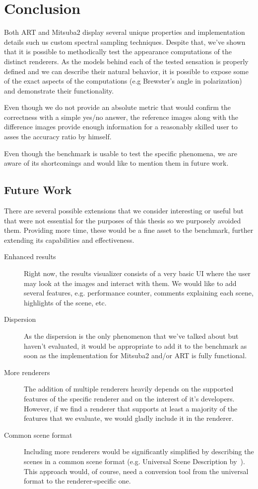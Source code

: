 \chapter*{Conclusion}

Both ART and Mitsuba2 display several unique properties and implementation details such us custom spectral sampling techniques. Despite that, we've shown that it is possible to methodically test the appearance computations of the distinct renderers. As the models behind each of the tested sensation is properly defined and we can describe their natural behavior, it is possible to expose some of the exact aspects of the computations (e.g Brewster's angle in polarization) and demonstrate their functionality.

Even though we do not provide an absolute metric that would confirm the correctness with a simple yes/no answer, the reference images along with the difference images provide enough information for a reasonably skilled user to asses the accuracy ratio by himself.

Even though the benchmark is usable to test the specific phenomena, we are aware of its shortcomings and would like to mention them in future work. 

\section{Future Work}

There are several possible extensions that we consider interesting or useful but that were not essential for the purposes of this thesis so we purposely avoided them. Providing more time, these would be a fine asset to the benchmark, further extending its capabilities and effectiveness.

\begin{description}
	\item[Enhanced results] Right now, the results visualizer consists of a very basic UI where the user may look at the images and interact with them. We would like to add several features, e.g. performance counter, comments explaining each scene, highlights of the scene, etc.
	\item[Dispersion] As the dispersion is the only phenomenon that we've talked about but haven't evaluated, it would be appropriate to add it to the benchmark as soon as the implementation for Mitsuba2 and/or ART is fully functional.
	\item[More renderers] The addition of multiple renderers heavily depends on the supported features of the specific renderer and on the interest of it's developers. However, if we find a renderer that supports at least a majority of the features that we evaluate, we would gladly include it in the renderer.
	\item[Common scene format] Including more renderers would be significantly simplified by describing the scenes in a common scene format (e.g. Universal Scene Description by~\citet{usdDoc}). This approach would, of course, need a conversion tool from the universal format to the renderer-specific one.
\end{description}
